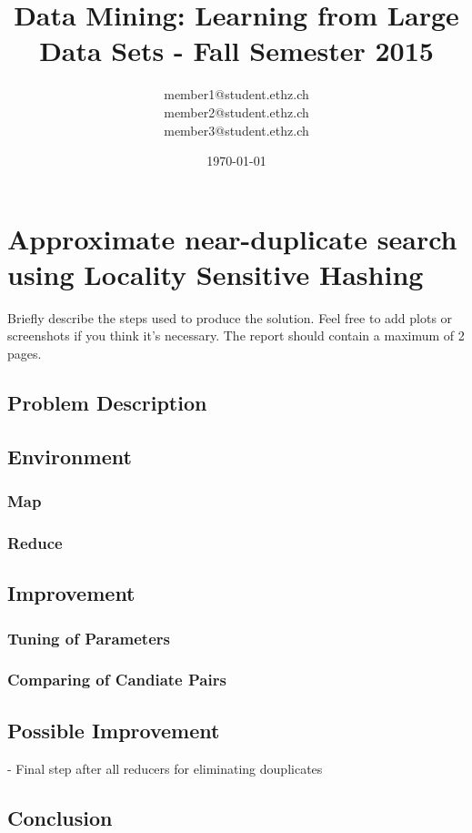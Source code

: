 \documentclass[a4paper, 11pt]{article}
\title{Data Mining: Learning from Large Data Sets - Fall Semester 2015}
\author{member1@student.ethz.ch\\ member2@student.ethz.ch\\ member3@student.ethz.ch\\}
\date{\today}
\begin{document}
\maketitle

\section*{Approximate near-duplicate search using Locality Sensitive Hashing} 
Briefly describe the steps used to produce the solution. Feel
free to add plots or screenshots if you think it's necessary. The
report should contain a maximum of 2 pages.

\subsection{Problem Description}

\subsection{Environment}

\subsubsection{Map}

\subsubsection{Reduce}


\subsection{Improvement}

\subsubsection{Tuning of Parameters}

\subsubsection{Comparing of Candiate Pairs}

\subsection{Possible Improvement}

- Final step after all reducers for eliminating douplicates

\subsection{Conclusion}
\end{document}
